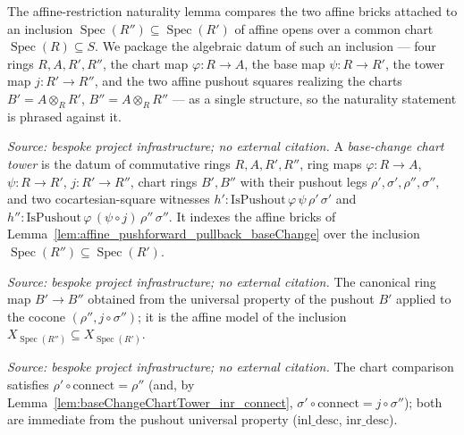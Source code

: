 The affine-restriction naturality lemma compares the two affine bricks attached to an
inclusion \(\operatorname{Spec}(R'') \subseteq \operatorname{Spec}(R')\) of affine opens
over a common chart \(\operatorname{Spec}(R) \subseteq S\). We package the algebraic datum
of such an inclusion --- four rings \(R, A, R', R''\), the chart map \(\varphi : R \to A\),
the base map \(\psi : R \to R'\), the tower map \(j : R' \to R''\), and the two affine
pushout squares realizing the charts \(B' = A \otimes_R R'\), \(B'' = A \otimes_R R''\) ---
as a single structure, so the naturality statement is phrased against it.

\begin{definition}\leanok
  \label{def:baseChangeChartTower}
  \textit{Source: bespoke project infrastructure; no external citation.}
  A \emph{base-change chart tower} is the datum of commutative rings \(R, A, R', R''\),
  ring maps \(\varphi : R \to A\), \(\psi : R \to R'\), \(j : R' \to R''\), chart rings
  \(B', B''\) with their pushout legs \(\rho', \sigma', \rho'', \sigma''\), and two
  cocartesian-square witnesses \(h' : \mathrm{IsPushout}\,\varphi\,\psi\,\rho'\,\sigma'\)
  and \(h'' : \mathrm{IsPushout}\,\varphi\,(\psi \circ j)\,\rho''\,\sigma''\). It indexes
  the affine bricks of Lemma~\ref{lem:affine_pushforward_pullback_baseChange} over the
  inclusion \(\operatorname{Spec}(R'') \subseteq \operatorname{Spec}(R')\).
\end{definition}

\begin{definition}\leanok
  \label{def:baseChangeChartTower_connect}
  \textit{Source: bespoke project infrastructure; no external citation.}
  The canonical ring map \(B' \to B''\) obtained from the universal property of the
  pushout \(B'\) applied to the cocone \((\rho'', j \circ \sigma'')\); it is the affine
  model of the inclusion \(X_{\operatorname{Spec}(R'')} \subseteq X_{\operatorname{Spec}(R')}\).
\end{definition}

\begin{lemma}\leanok
  \label{lem:baseChangeChartTower_inl_connect}
  \textit{Source: bespoke project infrastructure; no external citation.}
  The chart comparison satisfies \(\rho' \circ \mathrm{connect} = \rho''\) (and, by
  Lemma~\ref{lem:baseChangeChartTower_inr_connect}, \(\sigma' \circ \mathrm{connect}
  = j \circ \sigma''\)); both are immediate from the pushout universal property
  (\(\mathrm{inl\_desc}\), \(\mathrm{inr\_desc}\)).
\end{lemma}

